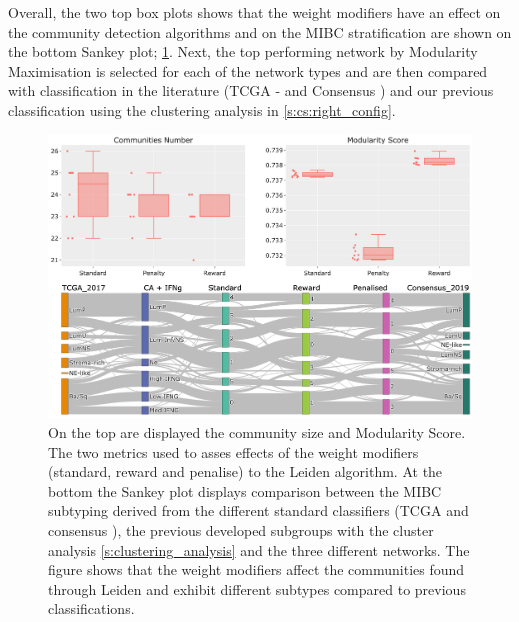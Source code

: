 Overall, the two top box plots shows that the weight modifiers have an effect on the community detection algorithms and on the MIBC stratification are shown on the bottom Sankey plot; \cref{fig:N_I:tum_leiden_modifiers}. Next, the top performing network by Modularity Maximisation is selected for each of the network types and are then compared with classification in the literature (TCGA - \citep{Robertson2017-mg} and Consensus \citep{Kamoun2020-tj}) and our previous classification using the clustering analysis in \cref{s:cs:right_config}. 


\begin{figure}[!t]    
    \centering
    \includegraphics[width=1.0\textwidth,keepaspectratio]{Sections/Network_I/Resources/Tum_network/LeidenMetrics_Sankey_TF-6.png}
    \caption{On the top are displayed the community size and Modularity Score. The two metrics used to asses effects of the weight modifiers (standard, reward and penalise) to the Leiden algorithm. At the bottom the Sankey plot displays comparison between the MIBC subtyping derived from the different standard classifiers (TCGA \citep{Robertson2017-mg} and consensus \citep{Kamoun2020-tj}), the previous developed subgroups with the cluster analysis \cref{s:clustering_analysis} and the three different networks. The figure shows that the weight modifiers affect the communities found through Leiden and exhibit different subtypes compared to previous classifications.}
    \label{fig:N_I:tum_leiden_modifiers}
\end{figure}

